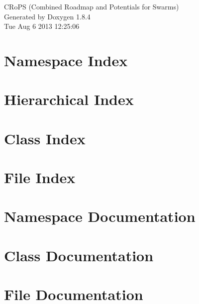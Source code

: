 \documentclass[twoside]{book}
\newcommand{\clearemptydoublepage}{%
  \newpage{\pagestyle{empty}\cleardoublepage}%
}
\begin{document}
\hypersetup{pageanchor=false}
\begin{titlepage}
\vspace*{7cm}
\begin{center}%
{\Large C\-Ro\-P\-S (Combined Roadmap and Potentials for Swarms) }\\
\vspace*{1cm}
{\large Generated by Doxygen 1.8.4}\\
\vspace*{0.5cm}
{\small Tue Aug 6 2013 12:25:06}\\
\end{center}
\end{titlepage}
\clearemptydoublepage
\tableofcontents
\clearemptydoublepage
{}
\hypersetup{pageanchor=true}

\chapter{Namespace Index}

\chapter{Hierarchical Index}

\chapter{Class Index}

\chapter{File Index}

\chapter{Namespace Documentation}











\chapter{Class Documentation}









\chapter{File Documentation}












\newpage
{}
{}
\printindex
\end{document}
